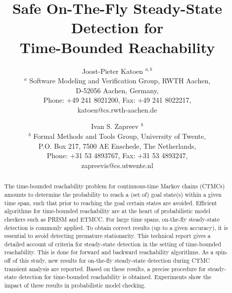 \documentclass[a4paper,11pt]{article}
\begin{document}
\title{Safe On-The-Fly Steady-State Detection for \\ Time-Bounded Reachability}

\author{ Joost-Pieter Katoen $^{a,b}$\\
   $^a$
   {\small Software Modeling and Verification Group, RWTH Aachen,}\\
   {\small D-52056 Aachen, Germany,}\\
   {\small Phone: +49 241 8021200, Fax: +49 241 8022217,}\\
   {\small katoen@cs.rwth-aachen.de}\\
 \and
   Ivan S. Zapreev $^b$ \\
   $^b$
   {\small Formal Methods and Tools Group, University of Twente,}\\
   {\small P.O. Box 217, 7500 AE Enschede, The Netherlands,}\\
   {\small Phone: +31 53 4893767, Fax: +31 53 4893247,}\\
   {\small zapreevis@cs.utwente.nl}\\
}



\maketitle
\thispagestyle{empty}

\begin{abstract}
The time-bounded reachability problem for continuous-time Markov chains (CTMCs) amounts 
to determine the probability to reach a (set of) goal state(s) within a given time span, such that 
prior to reaching the goal certain states are avoided. 
Efficient algorithms for time-bounded reachability are at the heart of probabilistic model checkers
such as PRISM and ETMCC.
For large time spans, on-the-fly steady-state detection is commonly applied. 
To obtain correct results (up to a given accuracy), it is essential to avoid detecting premature stationarity. 
This technical report gives a detailed account of criteria for  steady-state detection in the setting of time-bounded reachability. 
This is done for forward and backward reachability algorithms.  
As a spin-off of this study, new results for on-the-fly steady-state detection during CTMC 
transient analysis are reported.  
Based on these results, a precise procedure for steady-state detection for time-bounded 
reachability is obtained.  
Experiments show the impact of these results in probabilistic model checking.
\end{abstract}
\end{document}
